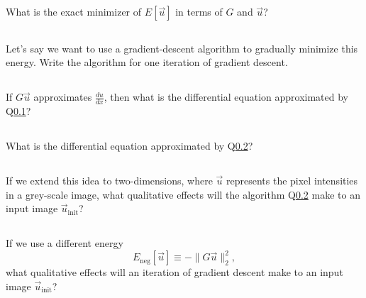 \subsection{} \label{minimizer}What is the exact minimizer of $E[\vec{u}]$ in terms of $G$ and $\vec{u}$?
\vspace{10cm}

\subsection{} \label{descent} Let's say we want to use a gradient-descent algorithm to gradually minimize this energy. Write the algorithm for one iteration of gradient descent.
\pagebreak

\subsection{} If $G\vec{u}$ approximates $\frac{du}{dx}$, then what is the differential equation approximated by Q\ref{minimizer}?
\vspace{5cm}

\subsection{} What is the differential equation approximated by Q\ref{descent}?
\vspace{5cm}

\subsection{} If we extend this idea to two-dimensions, where $\vec{u}$ represents the pixel intensities in a grey-scale image, what qualitative effects will the algorithm Q\ref{descent} make to an input image $\vec{u}_\text{init}$?
\vspace{5cm}

\subsection{} If we use a different energy
\begin{equation*}
E_\text{neg}[\vec{u}]\equiv -\|G \vec{u}\|_2^2 ,
\end{equation*}
what qualitative effects will an iteration of gradient descent make to an input image $\vec{u}_\text{init}$?
